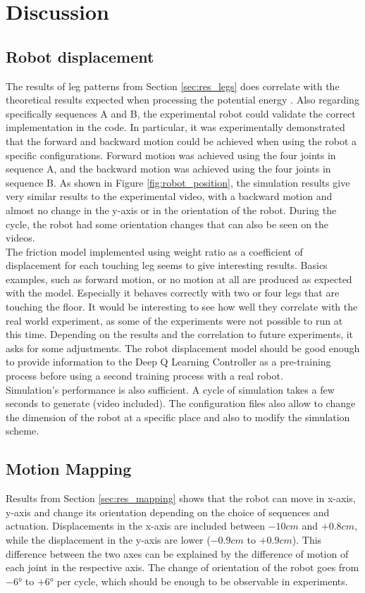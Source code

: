 \chapter{Discussion}
    \section{Robot displacement}
        The results of leg patterns from Section \ref{sec:res_legs} does correlate with the theoretical results expected when processing the potential energy \cite{mo_main_paper}. Also regarding specifically sequences A and B, the experimental robot could validate the correct implementation in the code. In particular, it was experimentally demonstrated that the forward and backward motion could be achieved when using the robot a specific configurations. Forward motion was achieved using the four joints in sequence A, and the backward motion was achieved using the four joints in sequence B. As shown in Figure \ref{fig:robot_position}, the simulation results give very similar results to the experimental video, with a backward motion and almost no change in the y-axis or in the orientation of the robot. During the cycle, the robot had some orientation changes that can also be seen on the videos.\\
        
        The friction model implemented using weight ratio as a coefficient of displacement for each touching leg seems to give interesting results. Basics examples, such as forward motion, or no motion at all are produced as expected with the model. Especially it behaves correctly with two or four legs that are touching the floor. It would be interesting to see how well they correlate with the real world experiment, as some of the experiments were not possible to run at this time. Depending on the results and the correlation to future experiments, it asks for some adjustments. The robot displacement model should be good enough to provide information to the Deep Q Learning Controller as a pre-training process before using a second training process with a real robot.\\
        
        Simulation's performance is also sufficient. A cycle of simulation takes a few seconds to generate (video included). The configuration files also allow to change the dimension of the robot at a specific place and also to modify the simulation scheme.
        
    \section{Motion Mapping}
        Results from Section \ref{sec:res_mapping} shows that the robot can move in x-axis, y-axis and change its orientation depending on the choice of sequences and actuation. Displacements in the x-axis are included between $-10cm$ and $+0.8cm$, while the displacement in the y-axis are lower ($-0.9cm$ to $+0.9cm$). This difference between the two axes can be explained by the difference of motion of each joint in the respective axis. The change of orientation of the robot goes from $-6$° to $+6$° per cycle, which should be enough to be observable in experiments. 
        
